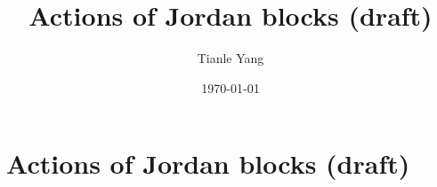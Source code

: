 \documentclass{noteformyself}
\title{Actions of Jordan blocks (draft)}
\author{Tianle Yang}
\date{\today}
\begin{document}
    \maketitle

    \section{Actions of Jordan blocks (draft)}


\end{document}
